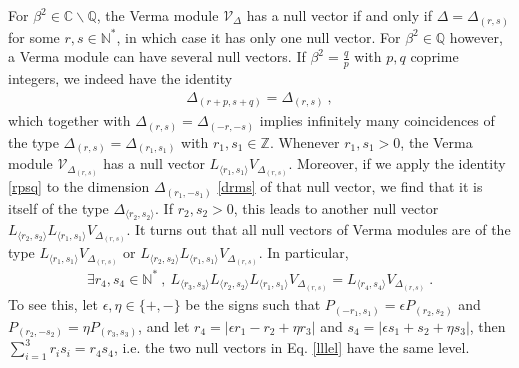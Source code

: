 \documentclass[12pt, a4paper]{article}
\theoremstyle{break}
\begin{document}
For $\beta^2\in\mathbb{C}\backslash \mathbb{Q}$, the Verma module $\mathcal{V}_\Delta$ has a null vector if and only if $\Delta=\Delta_{(r, s)}$ for some $r,s\in\mathbb{N}^*$, in which case it has only one null vector. For $\beta^2\in\mathbb{Q}$ however, a Verma module can have several null vectors. If $\beta^2 = \frac{q}{p}$ with $p,q$ coprime integers, we indeed have the identity
\begin{align}
 \Delta_{(r+p,s+q)} = \Delta_{(r,s)}\ ,
 \label{rpsq}
\end{align}
which together with $\Delta_{(r,s)}=\Delta_{(-r,-s)}$ implies infinitely many coincidences of the type $\Delta_{(r,s)}=\Delta_{(r_1,s_1)}$ with $r_1,s_1\in\mathbb{Z}$. 
Whenever $r_1,s_1>0$, the Verma module $\mathcal{V}_{\Delta_{(r,s)}}$ has a null vector $L_{\langle r_1,s_1\rangle} V_{\Delta_{(r,s)}}$. 
Moreover, if we apply the identity \eqref{rpsq} to the dimension $\Delta_{(r_1,-s_1)}$ \eqref{drms} of that null vector, we find that it is itself of the type $\Delta_{\langle r_2,s_2\rangle}$. If $r_2,s_2>0$, this leads to another null vector $L_{\langle r_2,s_2\rangle}L_{\langle r_1,s_1\rangle} V_{\Delta_{(r,s)}}$. It turns out that all null vectors of Verma modules are of the type $L_{\langle r_1,s_1\rangle} V_{\Delta_{(r,s)}}$ or $L_{\langle r_2,s_2\rangle}L_{\langle r_1,s_1\rangle} V_{\Delta_{(r,s)}}$. In particular,
\begin{align}
 \exists r_4,s_4\in \mathbb{N}^*\ , \ L_{\langle r_3,s_3\rangle}L_{\langle r_2,s_2\rangle}L_{\langle r_1,s_1\rangle} V_{\Delta_{(r,s)}} = L_{\langle r_4,s_4\rangle} V_{\Delta_{(r,s)}}\ .
 \label{lllel}
\end{align}
To see this, let $\epsilon,\eta\in\{+,-\}$ be the signs such that $P_{(-r_1,s_1)}=\epsilon P_{(r_2,s_2)}$ and $P_{(r_2,-s_2)}=\eta P_{(r_3,s_3)}$, and let $r_4=|\epsilon r_1-r_2+\eta r_3|$ and $s_4=|\epsilon s_1+s_2+\eta s_3|$, then $\sum_{i=1}^3 r_is_i=r_4s_4$, i.e. the two null vectors in Eq. \eqref{lllel} have the same level. 
\end{document}

